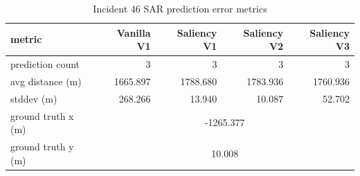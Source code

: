 \begin{table}[ht]
\centering
\caption{Incident 46 SAR prediction error metrics}
\label{tab:sar-incident-46}
\begin{tabular}{lrrrr}
\hline
metric & Vanilla V1 & Saliency V1 & Saliency V2 & Saliency V3 \\
\hline
prediction count & 3 & 3 & 3 & 3 \\
avg distance (m) & 1665.897 & 1788.680 & 1783.936 & 1760.936 \\
stddev (m) & 268.266 & 13.940 & 10.087 & 52.702 \\
ground truth x (m) & \multicolumn{4}{c}{-1265.377} \\
ground truth y (m) & \multicolumn{4}{c}{10.008} \\
\hline
\end{tabular}
\end{table}
